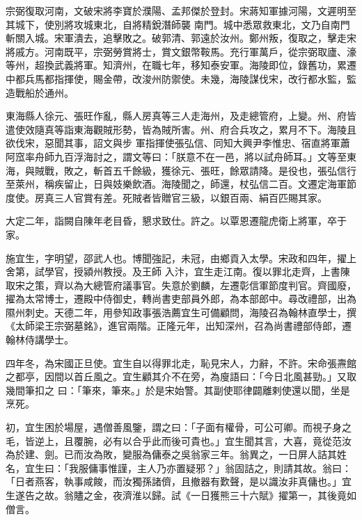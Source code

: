 \begin{pinyinscope}
 宗弼復取河南，文破宋將李寶於濮陽、孟邦傑於登封。宋蔣知軍據河陽，文遲明至其城下，使別將攻城東北，自將精銳潛師襲
 南門。城中悉眾救東北，文乃自南門斬關入城。宋軍潰去，追擊敗之。破郭清、郭遠於汝州。鄭州叛，復取之，擊走宋將戚方。河南既平，宗弼勞賞將士，賞文銀幣鞍馬。充行軍萬戶，從宗弼取廬、濠等州，超換武義將軍。知濟州，在職七年，移知泰安軍。海陵即位，錄舊功，累遷中都兵馬都指揮使，賜金帶，改浚州防禦使。未幾，海陵謀伐宋，改行都水監，監造戰船於通州。



 東海縣人徐元、張旺作亂，縣人房真等三人走海州，及走總管府，上變。州、府皆遣使效隨真等詣東海觀賊形勢，皆為賊所害。州、府合兵攻之，累月不下。海陵且欲伐宋，惡聞其事，詔文與步
 軍指揮使張弘信、同知大興尹李惟忠、宿直將軍蕭阿窊率舟師九百浮海討之，謂文等曰：「朕意不在一邑，將以試舟師耳。」文等至東海，與賊戰，敗之，斬首五千餘級，獲徐元、張旺，餘眾請降。是役也，張弘信行至萊州，稱疾留止，日與妓樂飲酒。海陵聞之，師還，杖弘信二百。文遷定海軍節度使。房真三人官賞有差。死賊者皆贈官三級，以銀百兩、絹百匹賜其家。



 大定二年，詣闕自陳年老目昏，懇求致仕。許之。以覃恩遷龍虎衛上將軍，卒于家。



 施宜生，字明望，邵武人也。博聞強記，未冠，由鄉貢入太學。宋政和四年，擢上舍第，試學官，授潁州教授。及王師
 入汴，宜生走江南。復以罪北走齊，上書陳取宋之策，齊以為大總管府議事官。失意於劉麟，左遷彰信軍節度判官。齊國廢，擢為太常博士，遷殿中侍御史，轉尚書吏部員外郎，為本部郎中。尋改禮部，出為隰州刺史。天德二年，用參知政事張浩薦宜生可備顧問，海陵召為翰林直學士，撰《太師梁王宗弼墓銘》，進官兩階。正隆元年，出知深州，召為尚書禮部侍郎，遷翰林侍講學士。



 四年冬，為宋國正旦使。宜生自以得罪北走，恥見宋人，力辭，不許。宋命張燾館之都亭，因間以首丘風之。宜生顧其介不在旁，為廋語曰：「今日北風甚勁。」又取幾間筆扣之
 曰：「筆來，筆來。」於是宋始警。其副使耶律闢離剌使還以聞，坐是烹死。



 初，宜生困於場屋，遇僧善風鑒，謂之曰：「子面有權骨，可公可卿。而視子身之毛，皆逆上，且覆腕，必有以合乎此而後可貴也。」宜生聞其言，大喜，竟從范汝為於建、劍。已而汝為敗，變服為傭泰之吳翁家三年。翁異之，一日屏人詰其姓名，宜生曰：「我服傭事惟謹，主人乃亦置疑邪？」翁固詰之，則請其故。翁曰：「日者燕客，執事咸餕，而汝獨孫諸儕，且撤器有歎聲，是以識汝非真傭也。」宜生遂告之故。翁贐之金，夜濟淮以歸。試《一日獲熊三十六賦》擢第一，其後竟如僧言。




\end{pinyinscope}
